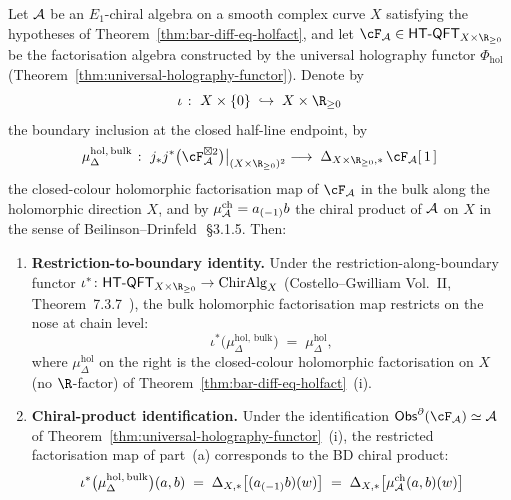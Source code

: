 \begin{theorem}
\label{thm:bulk-boundary-OPE-consistency}%
%
%
Let $\mathcal{A}$ be an $E_1$-chiral algebra on a smooth complex curve $X$
satisfying the hypotheses of Theorem~\ref{thm:bar-diff-eq-holfact},
and let $\cF_\cA \in \HTQFT_{X \times \R_{\geq 0}}$ be the
factorisation algebra constructed by the universal holography
functor $\Phi_{\mathrm{hol}}$
(Theorem~\ref{thm:universal-holography-functor}). Denote by
\[
 \iota \;\colon\; X \times \{0\} \;\hookrightarrow\;
 X \times \R_{\geq 0}
\]
the boundary inclusion at the closed half-line endpoint, by
\[
 \mu^{\mathrm{hol},\,\mathrm{bulk}}_\Delta \;\colon\;
 j_*j^*\bigl(\cF_\cA^{\boxtimes 2}\bigr)\bigl|_{(X\times\R_{\geq 0})^2}
 \;\longrightarrow\;
 \Delta_{X\times\R_{\geq 0},*}\,\cF_\cA[\,1\,]
\]
the closed-colour holomorphic factorisation map of $\cF_\cA$ in the
bulk along the holomorphic direction $X$, and by
$\mu^{\mathrm{ch}}_{\mathcal{A}} = a_{(-1)}b$ the chiral product of $\mathcal{A}$ on
$X$ in the sense of Beilinson--Drinfeld~\cite{BD04}\,\S3.1.5. Then:
\begin{enumerate}[label=\textup{(\alph*)}]
\item \textbf{Restriction-to-boundary identity.} Under the
restriction-along-boundary functor
$\iota^* \colon \HTQFT_{X\times\R_{\geq 0}} \to \mathrm{ChirAlg}_X$
(Costello--Gwilliam Vol.~II, Theorem~7.3.7~\cite{CG21}), the bulk
holomorphic factorisation map restricts on the nose at chain level:
\begin{equation}\label{eq:bulk-boundary-restriction}
 \iota^*\bigl(\mu^{\mathrm{hol},\,\mathrm{bulk}}_\Delta\bigr)
 \;=\;
 \mu^{\mathrm{hol}}_\Delta,
\end{equation}
where $\mu^{\mathrm{hol}}_\Delta$ on the right is the closed-colour
holomorphic factorisation on $X$ (no $\R$-factor) of
Theorem~\ref{thm:bar-diff-eq-holfact}~(i).
\item \textbf{Chiral-product identification.} Under the
identification $\Obs^\partial(\cF_\cA) \simeq \cA$ of
Theorem~\ref{thm:universal-holography-functor}~(i), the restricted
factorisation map of part~(a) corresponds to the BD chiral product:
\begin{equation}\label{eq:boundary-chiral-product}
 \iota^*\bigl(\mu^{\mathrm{hol},\,\mathrm{bulk}}_\Delta\bigr)(a,b)
 \;=\;
 \Delta_{X,*}\bigl[(a_{(-1)}b)(w)\bigr]
 \;=\;
 \Delta_{X,*}\bigl[\mu^{\mathrm{ch}}_\cA(a,b)(w)\bigr]

\end{equation}
\end{enumerate}
\end{theorem}
